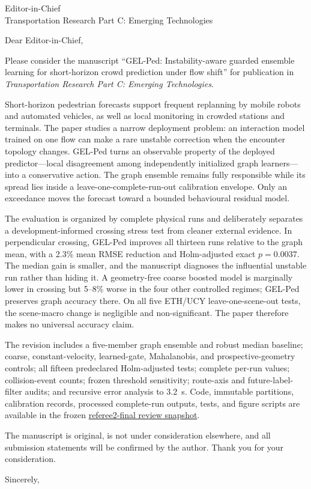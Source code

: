 \documentclass[10pt]{letter}
\begin{document}
\begin{letter}{Editor-in-Chief\\Transportation Research Part C: Emerging Technologies}
\opening{Dear Editor-in-Chief,}

Please consider the manuscript ``GEL-Ped: Instability-aware guarded ensemble learning for short-horizon crowd prediction under flow shift'' for publication in \emph{Transportation Research Part C: Emerging Technologies}.

Short-horizon pedestrian forecasts support frequent replanning by mobile robots and automated vehicles, as well as local monitoring in crowded stations and terminals. The paper studies a narrow deployment problem: an interaction model trained on one flow can make a rare unstable correction when the encounter topology changes. GEL-Ped turns an observable property of the deployed predictor---local disagreement among independently initialized graph learners---into a conservative action. The graph ensemble remains fully responsible while its spread lies inside a leave-one-complete-run-out calibration envelope. Only an exceedance moves the forecast toward a bounded behavioural residual model.

The evaluation is organized by complete physical runs and deliberately separates a development-informed crossing stress test from cleaner external evidence. In perpendicular crossing, GEL-Ped improves all thirteen runs relative to the graph mean, with a 2.3\% mean RMSE reduction and Holm-adjusted exact $p=0.0037$. The median gain is smaller, and the manuscript diagnoses the influential unstable run rather than hiding it. A geometry-free coarse boosted model is marginally lower in crossing but 5--8\% worse in the four other controlled regimes; GEL-Ped preserves graph accuracy there. On all five ETH/UCY leave-one-scene-out tests, the scene-macro change is negligible and non-significant. The paper therefore makes no universal accuracy claim.

The revision includes a five-member graph ensemble and robust median baseline; coarse, constant-velocity, learned-gate, Mahalanobis, and prospective-geometry controls; all fifteen predeclared Holm-adjusted tests; complete per-run values; collision-event counts; frozen threshold sensitivity; route-axis and future-label-filter audits; and recursive error analysis to 3.2~s. Code, immutable partitions, calibration records, processed complete-run outputs, tests, and figure scripts are available in the frozen \href{https://github.com/AmirNetwork/GEL-Ped/tree/referee2-final}{referee2-final review snapshot}.

The manuscript is original, is not under consideration elsewhere, and all submission statements will be confirmed by the author. Thank you for your consideration.

\closing{Sincerely,}
\end{letter}
\end{document}
